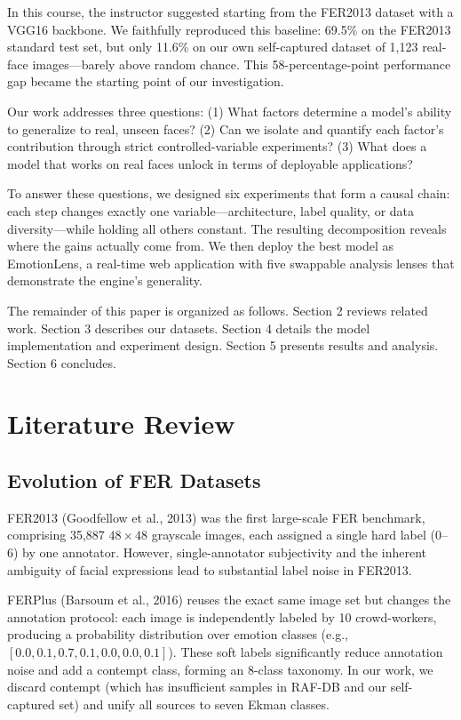 \documentclass[12pt,a4paper]{article}
\begin{document}
In this course, the instructor suggested starting from the FER2013 dataset with a VGG16 backbone. We faithfully reproduced this baseline: 69.5\% on the FER2013 standard test set, but only 11.6\% on our own self-captured dataset of 1,123 real-face images---barely above random chance. This 58-percentage-point performance gap became the starting point of our investigation.

Our work addresses three questions: (1) What factors determine a model's ability to generalize to real, unseen faces? (2) Can we isolate and quantify each factor's contribution through strict controlled-variable experiments? (3) What does a model that works on real faces unlock in terms of deployable applications?

To answer these questions, we designed six experiments that form a causal chain: each step changes exactly one variable---architecture, label quality, or data diversity---while holding all others constant. The resulting decomposition reveals where the gains actually come from. We then deploy the best model as EmotionLens, a real-time web application with five swappable analysis lenses that demonstrate the engine's generality.

The remainder of this paper is organized as follows. Section 2 reviews related work. Section 3 describes our datasets. Section 4 details the model implementation and experiment design. Section 5 presents results and analysis. Section 6 concludes.

\section{Literature Review}

\subsection{Evolution of FER Datasets}

FER2013 (Goodfellow et al., 2013) was the first large-scale FER benchmark, comprising 35,887 $48\times48$ grayscale images, each assigned a single hard label (0--6) by one annotator. However, single-annotator subjectivity and the inherent ambiguity of facial expressions lead to substantial label noise in FER2013.

FERPlus (Barsoum et al., 2016) reuses the exact same image set but changes the annotation protocol: each image is independently labeled by 10 crowd-workers, producing a probability distribution over emotion classes (e.g., $[0.0, 0.1, 0.7, 0.1, 0.0, 0.0, 0.1]$). These soft labels significantly reduce annotation noise and add a contempt class, forming an 8-class taxonomy. In our work, we discard contempt (which has insufficient samples in RAF-DB and our self-captured set) and unify all sources to seven Ekman classes.
\end{document}
